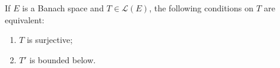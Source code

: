 If $E$ is a Banach space and $T \in \mathcal{L}(E)$, the following conditions on $T$ are equivalent:
\begin{enumerate}
\item[(a)] $T$ is surjective;
\item[(b)] $T'$ is bounded below.
\end{enumerate}
